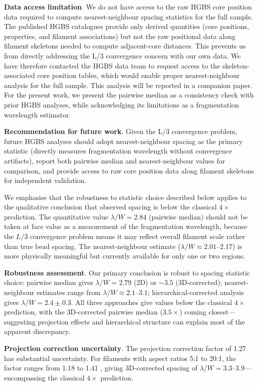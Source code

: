 \documentclass[twocolumn]{mnras}
\begin{document}
\textbf{Data access limitation}. We do not have access to the raw HGBS core position data required to compute nearest-neighbour spacing statistics for the full sample. The published HGBS catalogues provide only derived quantities (core positions, properties, and filament associations) but not the raw positional data along filament skeletons needed to compute adjacent-core distances. This prevents us from directly addressing the L/3 convergence concern with our own data. We have therefore contacted the HGBS data team to request access to the skeleton-associated core position tables, which would enable proper nearest-neighbour analysis for the full sample. This analysis will be reported in a companion paper. For the present work, we present the pairwise median as a consistency check with prior HGBS analyses, while acknowledging its limitations as a fragmentation wavelength estimator.

\textbf{Recommendation for future work}. Given the L/3 convergence problem, future HGBS analyses should adopt nearest-neighbour spacing as the primary statistic (directly measures fragmentation wavelength without convergence artifacts), report both pairwise median and nearest-neighbour values for comparison, and provide access to raw core position data along filament skeletons for independent validation.

We emphasise that the robustness to statistic choice described below applies to the qualitative conclusion that observed spacing is below the classical $4\times$ prediction. The quantitative value $\lambda/W = 2.84$ (pairwise median) should not be taken at face value as a measurement of the fragmentation wavelength, because the $L/3$ convergence problem means it may reflect overall filament scale rather than true bead spacing. The nearest-neighbour estimate ($\lambda/W \approx 2.01$--$2.17$) is more physically meaningful but currently available for only one or two regions.

\textbf{Robustness assessment}. Our primary conclusion is robust to spacing statistic choice: pairwise median gives $\lambda/W = 2.79$ (2D) or $\sim 3.5$ (3D-corrected); nearest-neighbour estimates range from $\lambda/W \approx 2.1$--$3.1$; hierarchical-corrected analysis gives $\lambda/W = 2.4 \pm 0.3$. All three approaches give values below the classical $4\times$ prediction, with the 3D-corrected pairwise median ($3.5\times$) coming closest—suggesting projection effects and hierarchical structure can explain most of the apparent discrepancy.

\textbf{Projection correction uncertainty}. The projection correction factor of 1.27 has substantial uncertainty. For filaments with aspect ratios 5:1 to 20:1, the factor ranges from 1.18 to 1.41 \citep{Hacar2013}, giving 3D-corrected spacing of $\lambda/W = 3.3$--$3.9$—encompassing the classical $4\times$ prediction.
\end{document}
